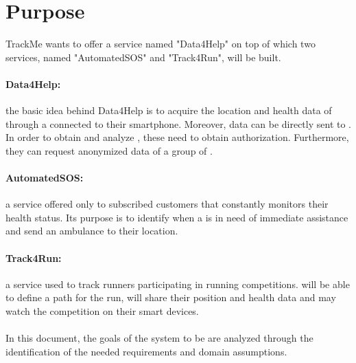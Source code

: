 \documentclass[../../rasd.tex]{subfiles}
\begin{document}
\section{Purpose\label{sect:1.1}}
			
			TrackMe wants to offer a service named "Data4Help" on top of which two services, named "AutomatedSOS" and "Track4Run", will be built.
			\paragraph{Data4Help:} the basic idea behind Data4Help is to acquire the location and health data of  through a  connected to their smartphone. Moreover, data can be directly sent to . In order to obtain and analyze , these need to obtain  authorization. Furthermore, they can request anonymized data of a group of .
			
			\paragraph{AutomatedSOS:} a service offered only to subscribed customers that constantly monitors their health status. Its purpose is to identify when a  is in need of immediate assistance and send an ambulance to their location.
			
			\paragraph{Track4Run:} a service used to track runners participating in running competitions.  will be able to define a path for the run,  will share their position and health data and  may watch the competition on their smart devices.\\\\
			In this document, the goals of the system to be are analyzed through the identification of the needed requirements and domain assumptions. 
\end{document}
